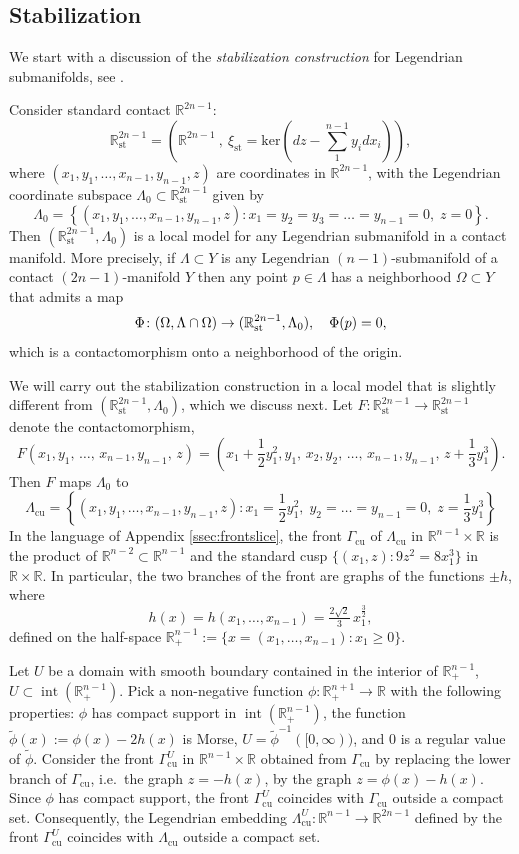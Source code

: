 \documentclass[reqno,11pt]{amsart}
\numberwithin{equation}{section}
\theoremstyle{my}
\theoremstyle{my}
\theoremstyle{your}
\newcommand{\R}{\mathbb{R}}
\renewcommand{\ker}{\mathrm{ker}}
\newcommand{\st}{\mathrm{st}}
\newcommand{\cu}{\mathrm{cu}}
\newcommand{\Int}{\operatorname{int}}
\newcommand{\wt}{\widetilde}
\begin{document}
\subsection{Stabilization}\label{ssec:stablization}
We start with a discussion of  the \emph{stabilization construction} for Legendrian submanifolds, see \cite{Eliash-Stein, CieEli-Stein, Mur}.

Consider standard contact $\R^{2n-1}$:
$$
\R^{2n-1}_\st=\left(\R^{2n-1} \ , \ \xi_\st=\ker\left(dz-\sum\limits_1^{n-1}y_i dx_i\right)\right),
$$
where  $(x_1,y_1,\dots,x_{n-1},y_{n-1},z)$ are coordinates in $\R^{2n-1}$, with the Legendrian  coordinate subspace $\Lambda_{0}\subset \R^{2n-1}_{\st}$ given by
\[
\Lambda_0=\left\{(x_1,y_1,\dots,x_{n-1},y_{n-1},z)\colon 
x_1=y_2=y_3=\dots=y_{n-1}=0,\; z=0\right\}.
\]
Then $(\R^{2n-1}_{\st},\Lambda_{0})$ is a local model for any Legendrian submanifold in a contact manifold. More precisely, if $\Lambda\subset Y$ is any Legendrian $(n-1)$-submanifold of a contact $(2n-1)$-manifold $Y$ then any point $p\in\Lambda$ has a neighborhood $\Omega\subset Y$ that admits a map
\[
\Phi\colon (\Omega,\Lambda\cap \Omega)\to (\R^{2n-1}_{\rm st},\Lambda_0),\quad \Phi(p)=0,
\]
which is a contactomorphism onto a neighborhood of the origin.

We will carry out the stabilization construction in a local model that is slightly different from $(\R^{2n-1}_{\st},\Lambda_0)$, which we discuss next. Let
$F\colon\R^{2n-1}_\st\to\R^{2n-1}_\st$ denote the contactomorphism,
\[
F(x_{1},y_1,\,\dots,\,x_{n-1},y_{n-1},\,z)=
\left(x_1+\frac12 y_1^2,y_1,\, x_2,y_2,\,\dots,\,x_{n-1},y_{n-1},\, z+\frac13 y_1^3 \right).
\]
Then $F$ maps $\Lambda_0$ to
\[
\Lambda_\cu =\left\{(x_1,y_1,\dots,x_{n-1},y_{n-1},z)\colon 
x_1=\frac{1}{2}y_1^{2},\; y_2=\dots=y_{n-1}=0,\; z=\frac{1}{3}y_1^{3}\right\}
\]   
In the language of Appendix \ref{ssec:frontslice}, the front $\Gamma_\cu$ of $\Lambda_\cu$ in $\R^{n-1}\times\R$ is the product of $\R^{n-2}\subset\R^{n-1}$ and the standard cusp 
$\{(x_1,z)\colon 9z^2= 8x_1^3\}$ in $\R\times\R$. In particular, the two branches of the front are graphs of the functions $\pm h$, where 
\[
h(x)=h(x_1,\dots,x_{n-1})= \tfrac{2\sqrt{2}}3\,x_1^{\frac{3}{2}},
\]
defined on the half-space $\R^{n-1}_+:=\{x=(x_1,\dots,x_{n-1})\colon x_1\geq 0\}$.

Let $U$ be a domain with smooth boundary contained in the interior of $\R^{n-1}_{+}$, $U\subset\Int(\R^{n-1}_+)$. Pick a non-negative function $\phi\colon \R^{n+1}_+\to\R$ with the following properties: $\phi$ has compact support in $\Int(\R^{n-1}_+)$,
the function $\wt\phi(x):=\phi(x)-2h(x)$ is Morse, $U =\wt\phi^{-1}([0,\infty))$, and $0$ is a regular value of $\wt\phi$. Consider the front $\Gamma_\cu^U$ in $\R^{n-1}\times\R$ obtained from $\Gamma_\cu$ by replacing the lower branch of $\Gamma_\cu$, i.e.~the graph 
$z=-h(x)$, by the graph $z=\phi(x)-h(x)$.  Since $\phi$ has compact support, the front  $\Gamma_\cu^U$ coincides with $\Gamma_\cu$ outside a compact set. Consequently, the Legendrian embedding $\Lambda_\cu^U\colon \R^{n-1}\to\R^{2n-1}$ defined by the front $\Gamma_\cu^U$ coincides with $\Lambda_\cu$ outside a compact set.
\end{document}
